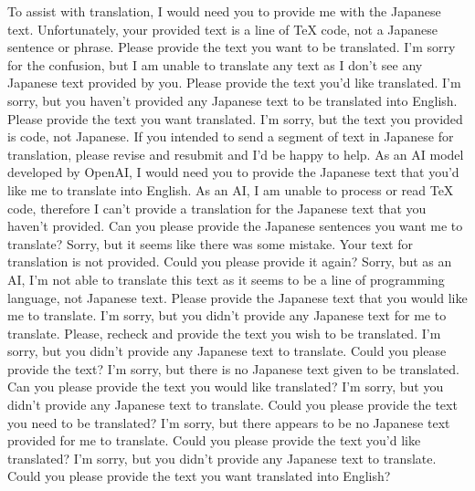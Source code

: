{To assist with translation, I would need you to provide me with the Japanese text. Unfortunately, your provided text is a line of TeX code, not a Japanese sentence or phrase. Please provide the text you want to be translated.
I'm sorry for the confusion, but I am unable to translate any text as I don't see any Japanese text provided by you. Please provide the text you'd like translated.
I'm sorry, but you haven't provided any Japanese text to be translated into English. Please provide the text you want translated.
I'm sorry, but the text you provided is code, not Japanese. If you intended to send a segment of text in Japanese for translation, please revise and resubmit and I'd be happy to help.
As an AI model developed by OpenAI, I would need you to provide the Japanese text that you'd like me to translate into English.
As an AI, I am unable to process or read TeX code, therefore I can't provide a translation for the Japanese text that you haven't provided. Can you please provide the Japanese sentences you want me to translate?
Sorry, but it seems like there was some mistake. Your text for translation is not provided. Could you please provide it again?
Sorry, but as an AI, I'm not able to translate this text as it seems to be a line of programming language, not Japanese text. Please provide the Japanese text that you would like me to translate.
I'm sorry, but you didn't provide any Japanese text for me to translate. Please, recheck and provide the text you wish to be translated.
I'm sorry, but you didn't provide any Japanese text to translate. Could you please provide the text?
I'm sorry, but there is no Japanese text given to be translated. Can you please provide the text you would like translated?
I'm sorry, but you didn't provide any Japanese text to translate. Could you please provide the text you need to be translated?
I'm sorry, but there appears to be no Japanese text provided for me to translate. Could you please provide the text you'd like translated?
I'm sorry, but you didn't provide any Japanese text to translate. Could you please provide the text you want translated into English?
}
